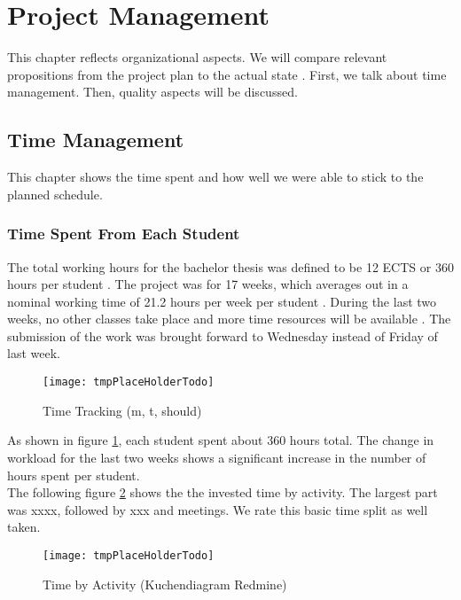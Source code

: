 \section{Project Management}
\label{section:project_management}
This chapter reflects organizational aspects.
We will compare relevant propositions from the project plan to the actual state \cite{projectplan}.
First, we talk about time management. Then, quality aspects will be discussed.

\subsection{Time Management}
This chapter shows the time spent and how well we were able to stick to the planned schedule.

\subsubsection{Time Spent From Each Student}
The total working hours for the bachelor thesis was defined to be 12 ECTS or 360 hours per student \cite{projectplan}.
The project was for 17 weeks, which averages out in a nominal working time of 21.2 hours per week per student \cite{projectplan}.
During the last two weeks, no other classes take place and more time resources will be available \cite{projectplan}.
The submission of the work was brought forward to Wednesday instead of Friday of last week.

\begin{figure}[H]
    \centering
    \texttt{[image: tmpPlaceHolderTodo]}
    \caption{Time Tracking (m, t, should)}
    \label{fig:timetracking}
\end{figure}

As shown in figure \ref{fig:timetracking}, each student spent about 360 hours total.
The change in workload for the last two weeks shows a significant increase in the number of hours spent per student. \\

The following figure \ref{fig:timetracking_activity} shows the the invested time by activity.
The largest part was xxxx, followed by xxx and meetings.
We rate this basic time split as well taken.

\begin{figure}[H]
    \centering
    \texttt{[image: tmpPlaceHolderTodo]}
    \caption{Time by Activity (Kuchendiagram Redmine)}
    \label{fig:timetracking_activity}
\end{figure}

